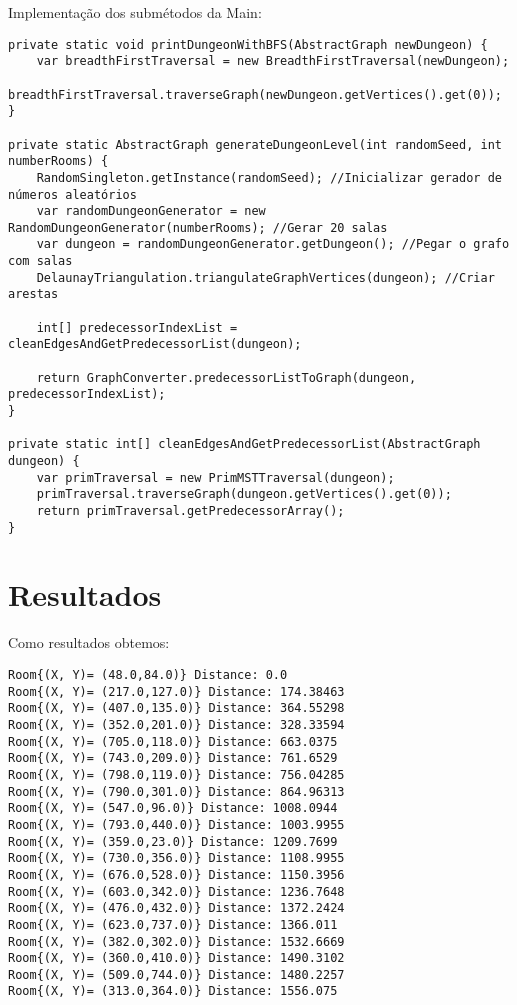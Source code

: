 \documentclass[a4paper, 12pt]{article}
\begin{document}
Implementação dos submétodos da Main:

\begin{verbatim}
private static void printDungeonWithBFS(AbstractGraph newDungeon) {
    var breadthFirstTraversal = new BreadthFirstTraversal(newDungeon);
    breadthFirstTraversal.traverseGraph(newDungeon.getVertices().get(0));
}

private static AbstractGraph generateDungeonLevel(int randomSeed, int numberRooms) {
    RandomSingleton.getInstance(randomSeed); //Inicializar gerador de números aleatórios
    var randomDungeonGenerator = new RandomDungeonGenerator(numberRooms); //Gerar 20 salas
    var dungeon = randomDungeonGenerator.getDungeon(); //Pegar o grafo com salas
    DelaunayTriangulation.triangulateGraphVertices(dungeon); //Criar arestas

    int[] predecessorIndexList = cleanEdgesAndGetPredecessorList(dungeon);

    return GraphConverter.predecessorListToGraph(dungeon, predecessorIndexList);
}

private static int[] cleanEdgesAndGetPredecessorList(AbstractGraph dungeon) {
    var primTraversal = new PrimMSTTraversal(dungeon);
    primTraversal.traverseGraph(dungeon.getVertices().get(0));
    return primTraversal.getPredecessorArray();
}
\end{verbatim}

\newpage
\section{Resultados}
\graphicspath{ {./Results/} }
Como resultados obtemos:

\begin{verbatim}
Room{(X, Y)= (48.0,84.0)} Distance: 0.0 
Room{(X, Y)= (217.0,127.0)} Distance: 174.38463 
Room{(X, Y)= (407.0,135.0)} Distance: 364.55298 
Room{(X, Y)= (352.0,201.0)} Distance: 328.33594 
Room{(X, Y)= (705.0,118.0)} Distance: 663.0375 
Room{(X, Y)= (743.0,209.0)} Distance: 761.6529 
Room{(X, Y)= (798.0,119.0)} Distance: 756.04285 
Room{(X, Y)= (790.0,301.0)} Distance: 864.96313 
Room{(X, Y)= (547.0,96.0)} Distance: 1008.0944 
Room{(X, Y)= (793.0,440.0)} Distance: 1003.9955 
Room{(X, Y)= (359.0,23.0)} Distance: 1209.7699 
Room{(X, Y)= (730.0,356.0)} Distance: 1108.9955 
Room{(X, Y)= (676.0,528.0)} Distance: 1150.3956 
Room{(X, Y)= (603.0,342.0)} Distance: 1236.7648 
Room{(X, Y)= (476.0,432.0)} Distance: 1372.2424 
Room{(X, Y)= (623.0,737.0)} Distance: 1366.011 
Room{(X, Y)= (382.0,302.0)} Distance: 1532.6669 
Room{(X, Y)= (360.0,410.0)} Distance: 1490.3102 
Room{(X, Y)= (509.0,744.0)} Distance: 1480.2257 
Room{(X, Y)= (313.0,364.0)} Distance: 1556.075 
\end{verbatim}
\end{document}
